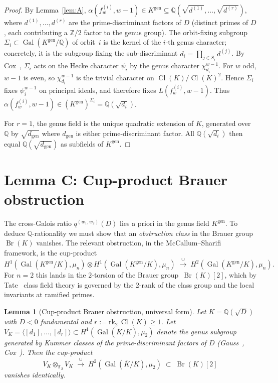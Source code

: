 \documentclass[11pt,a4paper]{amsart}
\theoremstyle{plain}
\newtheorem{lemma}[theorem]{Lemma}
\theoremstyle{definition}
\DeclareMathOperator{\Cl}{Cl}
\DeclareMathOperator{\Gal}{Gal}
\DeclareMathOperator{\Br}{Br}
\newcommand{\Q}{\mathbb{Q}}
\newcommand{\Z}{\mathbb{Z}}
\newcommand{\Kgen}{K^{\mathrm{gen}}}
\newcommand{\fl}[2]{f_{#1}^{(#2)}}
\newcommand{\qstr}[2]{q^{(#1,#2)}}
\newcommand{\dgen}{d_{\mathrm{gen}}}
\begin{document}
\begin{proof}
By Lemma~\ref{lem:A}, $\alpha(\fl{w}{i}, w{-}1) \in \Kgen
\subseteq \Q(\sqrt{d^{(1)}}, \ldots, \sqrt{d^{(r)}})$, where
$d^{(1)}, \ldots, d^{(r)}$ are the prime-discriminant factors of $D$
(distinct primes of $D$, each contributing a $\Z/2$ factor to the genus
group).  The orbit-fixing subgroup
$\Sigma_i \subset \Gal(\Kgen / \Q)$ of orbit~$i$ is the kernel of the
$i$-th genus character; concretely, it is the subgroup fixing the
sub-discriminant $d_i = \prod_{j \in S_i} d^{(j)}$.  By
Cox~\cite[\S 6.B]{Cox1989}, $\Sigma_i$ acts on the Hecke character
$\psi_i$ by the genus character $\chi_{d_i}^{w-1}$.  For $w$ odd, $w-1$
is even, so $\chi_{d_i}^{w-1}$ is the trivial character on
$\Cl(K)/\Cl(K)^2$.  Hence $\Sigma_i$ fixes $\psi_i^{w-1}$ on principal
ideals, and therefore fixes $L(\fl{w}{i}, w-1)$.  Thus
$\alpha(\fl{w}{i}, w-1) \in (\Kgen)^{\Sigma_i} = \Q(\sqrt{d_i})$.

For $r = 1$, the genus field is the unique quadratic extension of $K$,
generated over $\Q$ by $\sqrt{\dgen}$ where $\dgen$ is either
prime-discriminant factor.  All $\Q(\sqrt{d_i})$ then equal
$\Q(\sqrt{\dgen})$ as subfields of $\Kgen$.
\end{proof}

\section{Lemma C: Cup-product Brauer obstruction}\label{sec:lemma-C}

The cross-Galois ratio $\qstr{w_1}{w_2}(D)$ lies a priori in the genus
field $\Kgen$.  To deduce $\Q$-rationality we must show that an
\emph{obstruction class} in the Brauer group $\Br(K)$ vanishes.  The
relevant obstruction, in the McCallum--Sharifi~\cite{McCallumSharifi2002}
framework, is the cup-product
\[
   H^1(\Gal(\Kgen/K), \mu_n) \otimes H^1(\Gal(\Kgen/K), \mu_n)
   \;\xrightarrow{\;\cup\;}\;
   H^2(\Gal(\Kgen/K), \mu_n).
\]
For $n = 2$ this lands in the $2$-torsion of the Brauer group~$\Br(K)[2]$,
which by Tate~\cite{Tate1967} class field theory is governed by the
$2$-rank of the class group and the local invariants at ramified primes.

\begin{lemma}[Cup-product Brauer obstruction, universal form]\label{lem:C-universal}
Let $K = \Q(\sqrt{D})$ with $D < 0$ fundamental and
$r := \mathrm{rk}_2\,\Cl(K) \ge 1$. Let
$V_K = \langle [d_1], \ldots, [d_r] \rangle \subset H^1(\Gal(\overline K/K), \mu_2)$
denote the genus subgroup generated by Kummer classes of the prime-discriminant
factors of $D$ (Gauss~\cite[\S\S 225--237]{Gauss1801},
Cox~\cite[Thm.~6.1]{Cox1989}). Then the cup-product
\[
   V_K \otimes_{\mathbb{F}_2} V_K \;\xrightarrow{\;\cup\;}\;
   H^2(\Gal(\overline K/K), \mu_2) \;\subset\; \Br(K)[2]
\]
vanishes identically.
\end{lemma}
\end{document}

